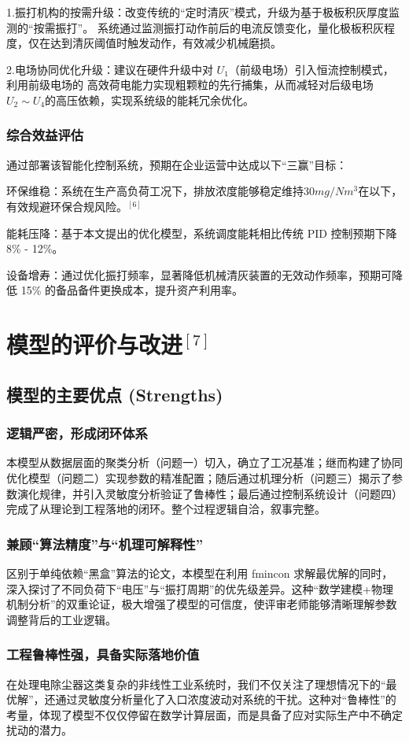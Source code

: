 \documentclass[UTF8, a4paper]{ctexart}
\begin{document}
1.振打机构的按需升级：改变传统的“定时清灰”模式，升级为基于极板积灰厚度监测的“按需振打”。
系统通过监测振打动作前后的电流反馈变化，量化极板积灰程度，仅在达到清灰阈值时触发动作，有效减少机械磨损。

2.电场协同优化升级：建议在硬件升级中对 $U_1$（前级电场）引入恒流控制模式，利用前级电场的
高效荷电能力实现粗颗粒的先行捕集，从而减轻对后级电场$U_2 \sim U_4$的高压依赖，实现系统级的能耗冗余优化。
\subsubsection{综合效益评估}
通过部署该智能化控制系统，预期在企业运营中达成以下“三赢”目标：

环保维稳：系统在生产高负荷工况下，排放浓度能够稳定维持$30mg/Nm^3$在以下，有效规避环保合规风险。$^{[6]}$

能耗压降：基于本文提出的优化模型，系统调度能耗相比传统 PID 控制预期下降 8\% - 12\%。

设备增寿：通过优化振打频率，显著降低机械清灰装置的无效动作频率，预期可降低 15\% 的备品备件更换成本，提升资产利用率。

\section{模型的评价与改进$^{[7]}$}
\subsection{模型的主要优点 (Strengths)}
\subsubsection{逻辑严密，形成闭环体系} 本模型从数据层面的聚类分析（问题一）切入，确立了工况基准；继而构建了协同优化模型（问题二）实现参数的精准配置；随后通过机理分析（问题三）揭示了参数演化规律，并引入灵敏度分析验证了鲁棒性；最后通过控制系统设计（问题四）完成了从理论到工程落地的闭环。整个过程逻辑自洽，叙事完整。
\subsubsection{兼顾“算法精度”与“机理可解释性”} 区别于单纯依赖“黑盒”算法的论文，本模型在利用 fmincon 求解最优解的同时，深入探讨了不同负荷下“电压”与“振打周期”的优先级差异。这种“数学建模+物理机制分析”的双重论证，极大增强了模型的可信度，使评审老师能够清晰理解参数调整背后的工业逻辑。
\subsubsection{工程鲁棒性强，具备实际落地价值} 在处理电除尘器这类复杂的非线性工业系统时，我们不仅关注了理想情况下的“最优解”，还通过灵敏度分析量化了入口浓度波动对系统的干扰。这种对“鲁棒性”的考量，体现了模型不仅仅停留在数学计算层面，而是具备了应对实际生产中不确定扰动的潜力。
\end{document}
